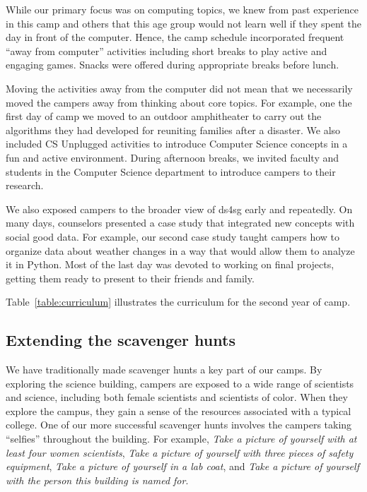 While our primary focus was on computing topics, we knew from past
experience in this camp and others that this age group
would not learn well if they spent the day in front of the computer.
Hence, the camp schedule incorporated frequent ``away from computer''
activities including short breaks to play active and engaging games.
Snacks were offered during appropriate breaks before lunch. 

Moving the activities away from the computer did not mean that we
necessarily moved the campers away from thinking about core topics.
For example, one the first day of camp we moved to an outdoor
amphitheater to carry out the algorithms they had developed for
reuniting families after a disaster.  We also included CS Unplugged
\cite{csunplugged} activities to introduce Computer Science concepts
in a fun and active environment.  During afternoon breaks, we invited
faculty and students in the Computer Science department to introduce
campers to their research.

We also exposed campers to the broader view of ds4sg early and
repeatedly.  On many days, counselors presented a case study that
integrated new concepts with social good data. For example, our
second case study taught campers how to organize data about weather
changes in a way that would allow them to analyze it in Python.
Most of the last day was devoted to working on final projects,
getting them ready to present to their friends and family.

Table~\ref{table:curriculum} illustrates the curriculum for the
second year of camp.

\subsection{Extending the scavenger hunts}

We have traditionally made scavenger hunts a key part of our camps.
By exploring the science building, campers are exposed to
a wide range of scientists and science, including both female
scientists and scientists of color.  When they explore
the campus, they gain a sense of the resources associated with
a typical college.  One of our more successful
scavenger hunts involves the campers taking ``selfies'' throughout
the building.  For example, \textit{Take a picture of yourself with at
least four women scientists}, \textit{Take a picture of yourself with
three pieces of safety equipment}, \textit{Take a picture of yourself
in a lab coat},  and \textit{Take a picture of yourself with the person this
building is named for}.

